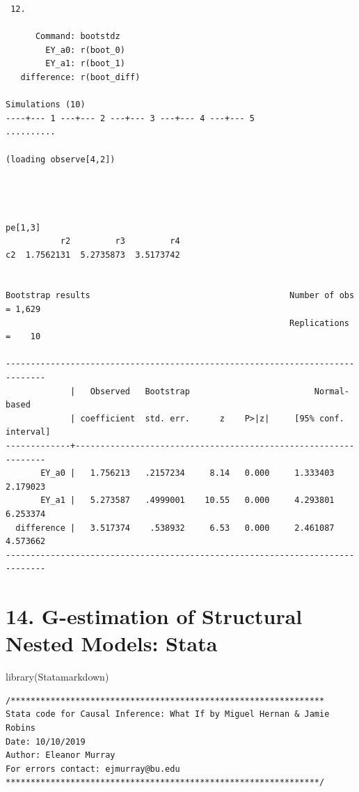 \documentclass[
  10pt,
  a4paper,
]{book}
\newenvironment{Shaded}{\begin{snugshade}}{\end{snugshade}}
\newcommand{\FunctionTok}[1]{\textcolor[rgb]{0.28,0.35,0.67}{#1}}
\newcommand{\NormalTok}[1]{\textcolor[rgb]{0.00,0.46,0.62}{#1}}
\begin{document}
\begin{verbatim}
 12. 

      Command: bootstdz
        EY_a0: r(boot_0)
        EY_a1: r(boot_1)
   difference: r(boot_diff)

Simulations (10)
----+--- 1 ---+--- 2 ---+--- 3 ---+--- 4 ---+--- 5 
..........

(loading observe[4,2])




pe[1,3]
           r2         r3         r4
c2  1.7562131  5.2735873  3.5173742


Bootstrap results                                        Number of obs = 1,629
                                                         Replications  =    10

------------------------------------------------------------------------------
             |   Observed   Bootstrap                         Normal-based
             | coefficient  std. err.      z    P>|z|     [95% conf. interval]
-------------+----------------------------------------------------------------
       EY_a0 |   1.756213   .2157234     8.14   0.000     1.333403    2.179023
       EY_a1 |   5.273587   .4999001    10.55   0.000     4.293801    6.253374
  difference |   3.517374    .538932     6.53   0.000     2.461087    4.573662
------------------------------------------------------------------------------
\end{verbatim}

\hypertarget{g-estimation-of-structural-nested-models-stata}{%
\chapter*{14. G-estimation of Structural Nested Models: Stata}\label{g-estimation-of-structural-nested-models-stata}}

\begin{Shaded}
\begin{Highlighting}[]
\FunctionTok{library}\NormalTok{(Statamarkdown)}
\end{Highlighting}
\end{Shaded}

\begin{verbatim}
/***************************************************************
Stata code for Causal Inference: What If by Miguel Hernan & Jamie Robins
Date: 10/10/2019
Author: Eleanor Murray 
For errors contact: ejmurray@bu.edu
***************************************************************/
\end{verbatim}
\end{document}
